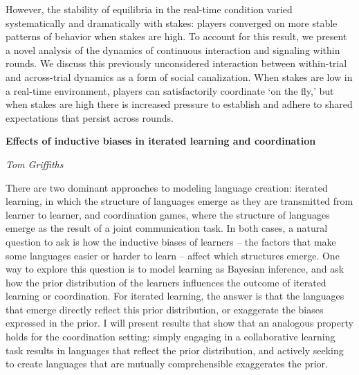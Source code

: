 \documentclass[10pt,letterpaper]{article}
\begin{document}
However, the stability of equilibria in the real-time condition varied systematically and dramatically with stakes: players converged on more stable patterns of behavior when stakes are high. To account for this result, we present a novel analysis of the dynamics of continuous interaction and signaling within rounds. We discuss this previously unconsidered interaction between within-trial and across-trial dynamics as a form of social canalization. When stakes are low in a real-time environment, players can satisfactorily coordinate `on the fly,' but when stakes are high there is increased pressure to establish and adhere to shared expectations that persist across rounds. 
\vspace{1cm}


\begin{center}\textbf{Effects of inductive biases in iterated learning and coordination}\end{center}
\begin{center}\emph{Tom Griffiths}\end{center}

There are two dominant approaches to modeling language creation: iterated learning, in which the structure of languages emerge as they are transmitted from learner to learner, and coordination games, where the structure of languages emerge as the result of a joint communication task. In both cases, a natural question to ask is how the inductive biases of learners -- the factors that make some languages easier or harder to learn -- affect which structures emerge. One way to explore this question is to model learning as Bayesian inference, and ask how the prior distribution of the learners influences the outcome of iterated learning or coordination. For iterated learning, the answer is that the languages that emerge directly reflect this prior distribution, or exaggerate the biases expressed in the prior. I will present results that show that an analogous property holds for the coordination setting: simply engaging in a collaborative learning task results in languages that reflect the prior distribution, and actively seeking to create languages that are mutually comprehensible exaggerates the prior.



\setlength{\bibleftmargin}{.125in}
\setlength{\bibindent}{-\bibleftmargin}


\end{document}
